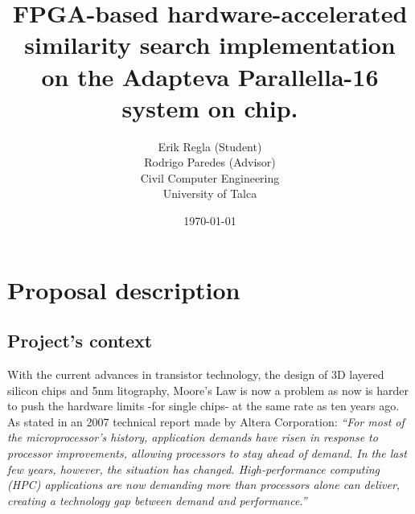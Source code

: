\documentclass[11pt,letterpaper]{article}
\begin{document}
\pagestyle{empty}

\title{
    FPGA-based hardware-accelerated similarity search implementation on the Adapteva Parallella-16 system on chip.
}
\author{
Erik Regla (Student)\\%
Rodrigo Paredes (Advisor)\\%
Civil Computer Engineering\\ 
University of Talca}
\date{\today}
\maketitle

\section{Proposal description}


\subsection{Project's context} 

    With the current advances in transistor technology, the design of 3D layered silicon chips and 5nm 
    litography, Moore's Law is now a problem as now is harder to push the hardware limits -for single chips-
    at the same rate as ten years ago\cite{7478302,EETIMES1}. As stated in an 2007 technical report made by Altera
    Corporation: \emph{``For most of the microprocessor's history, application demands have risen in response to 
    processor improvements, allowing processors to stay ahead of demand. In the last few years, however, the 
    situation has changed. High-performance computing (HPC) applications are now demanding more than processors 
    alone can deliver, creating a technology gap between demand and performance.''}\cite{ALTERA_Accel_fpga}
\end{document}
